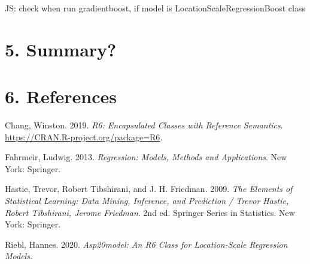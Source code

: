 \documentclass[
]{report}
\newlength{\cslhangindent}
\newenvironment{cslreferences}%
  {\setlength{\parindent}{0pt}%
  \everypar{\setlength{\hangindent}{\cslhangindent}}\ignorespaces}%
  {\par}
\begin{document}
JS: check when run gradientboost, if model is
LocationScaleRegressionBoost class

\hypertarget{summary}{%
\chapter{5. Summary?}\label{summary}}

\hypertarget{references}{%
\chapter*{6. References}\label{references}}

\hypertarget{refs}{}
\begin{cslreferences}
\leavevmode\hypertarget{ref-R-R6}{}%
Chang, Winston. 2019. \emph{R6: Encapsulated Classes with Reference
Semantics}. \url{https://CRAN.R-project.org/package=R6}.

\leavevmode\hypertarget{ref-Fahrmeir.2013}{}%
Fahrmeir, Ludwig. 2013. \emph{Regression: Models, Methods and
Applications}. New York: Springer.

\leavevmode\hypertarget{ref-Hastie.2009}{}%
Hastie, Trevor, Robert Tibshirani, and J. H. Friedman. 2009. \emph{The
Elements of Statistical Learning: Data Mining, Inference, and Prediction
/ Trevor Hastie, Robert Tibshirani, Jerome Friedman}. 2nd ed. Springer
Series in Statistics. New York: Springer.

\leavevmode\hypertarget{ref-R-asp20model}{}%
Riebl, Hannes. 2020. \emph{Asp20model: An R6 Class for Location-Scale
Regression Models}.
\end{cslreferences}
\end{document}
